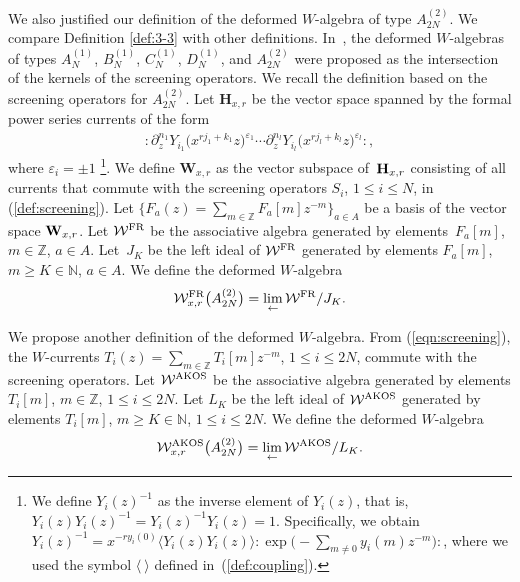 \documentclass[pdftex]{sigma}
\numberwithin{equation}{section}
\begin{document}
We also justified our definition of
the deformed $W$-algebra of type $A_{2N}^{(2)}$.
We compare Definition \ref{def:3-3} with other definitions.
In~\cite{Frenkel-Reshetikhin1},
the deformed $W$-algebras of type{s}
$A_N^{(1)}$, $B_N^{(1)}$, $C_N^{(1)}$, $D_N^{(1)}$, and $A_{2N}^{(2)}$
were proposed as the intersection of the kernels of the screening operators.
We recall the definition based on the screening operators for
$A_{2N}^{(2)}$.
Let {{${\mathbf H}_{x,r}$}}
be the vector space spanned by
the formal power series currents of the form
\begin{gather*}
{:}\partial_z^{n_1} Y_{i_1}\big(x^{r j_1+k_1}{z}\big)^{\varepsilon_1}\cdots
\partial_z^{n_l} Y_{i_l}\big(x^{r j_l+k_l}{z}\big)^{\varepsilon_l}{:},
\end{gather*}
where $\varepsilon_i=\pm 1$
\footnote[2]{We define $Y_i(z)^{-1}$ as the inverse element of $Y_i(z)$, that is,
$Y_i(z) Y_i(z)^{-1}=Y_i(z)^{-1}Y_i(z)=1$. Specifically, we obtain
$Y_i(z)^{-1}=x^{-ry_i(0)}\langle Y_i(z)Y_i(z)\rangle
{:}\exp\bigl({-}\sum_{m \neq 0}y_i(m)z^{-m}\bigr){:}$,
where we used the symbol $\langle~\rangle$ defined in~(\ref{def:coupling}).}.
We define ${\mathbf W}_{x,r}$ as the vector subspace of~${\bf H}_{x,r}$
consisting of all currents that commute with the screening operators
$S_i$, $1\!\leq \!i \leq\! N$, in (\ref{def:screening}).
Let $\bigl\{F_a(z)\!=\!\sum_{m \in \mathbb{Z}}F_a[m]z^{-m}\bigr\}_{a \in A}$ be a basis of
the vector space ${\bf W}_{x,r}$. Let ${\mathcal W}^{\rm FR}$ be the associative algebra generated by
elements~$F_a[m]$, $m \in \mathbb{Z}$, $a \in A$.
Let~$J_K$ be the left ideal of ${\mathcal W}^{\rm FR}$
generated by elements $F_a[m]$, $m \geq K \in \mathbb{N}$, $a\in A$.
We define the deformed $W$-algebra
\begin{gather*}
{\mathcal W}_{x,r}^{\rm FR}\big(A_{2N}^{(2)}\big)=\lim_{\leftarrow}{\mathcal W}^{\rm FR}/J_K.
\end{gather*}

We propose another definition of the deformed $W$-algebra.
From (\ref{eqn:screening}), the $W$-currents
$T_i(z)=\sum_{m \in \mathbb{Z}}T_i[m]z^{-m}$, $1 \leq i \leq 2N$,
commute with the screening operators.
Let ${\mathcal W}^{\rm AKOS}$ be the associative algebra generated by
elements $T_i[m]$, $m \in \mathbb{Z}$, $1\leq i \leq 2N$.
Let $L_K$ be the left ideal of ${\mathcal W}^{\rm AKOS}$ generated by elements
$T_i[m]$, $m \geq K \in \mathbb{N}$, $1\leq i \leq 2N$.
We define the deformed $W$-algebra
\begin{gather*}
{\mathcal W}_{x,r}^{\rm AKOS}\big(A_{2N}^{(2)}\big)=\lim_{\leftarrow}{\mathcal W}^{\rm AKOS}/L_K.
\end{gather*}
\end{document}
